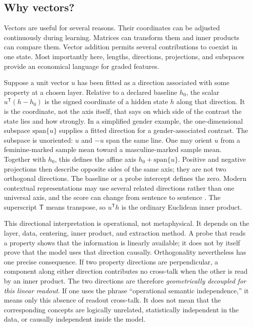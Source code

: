 \documentclass[
  aps,
  reprint,
  superscriptaddress,
  floatfix,
  nofootinbib,
  longbibliography
]{revtex4-2}
\newcommand{\T}{^{\mathsf T}}
\begin{document}
\subsection{Why vectors?}

Vectors are useful for several reasons.  Their coordinates can be adjusted
continuously during learning.  Matrices can transform them and inner products
can compare them.  Vector addition permits several contributions to coexist
in one state.  Most importantly here, lengths, directions, projections, and
subspaces provide an economical language for graded features.

Suppose a unit vector $u$ has been fitted as a direction associated with some
property at a chosen layer.  Relative to a declared baseline $h_0$, the scalar
$u\T(h-h_0)$ is the signed coordinate of a hidden state $h$ along that
direction.  It is the coordinate, not the axis itself, that says on which side
of the contrast the state lies and how strongly.  In a simplified gender
example, the one-dimensional subspace $\mathrm{span}\{u\}$ supplies a fitted
direction for a gender-associated contrast.  The subspace is unoriented:
$u$ and $-u$ span the same line.  One may orient $u$ from a feminine-marked
sample mean toward a masculine-marked sample mean.  Together with $h_0$, this
defines the affine axis $h_0+\mathrm{span}\{u\}$.  Positive and negative projections then
describe opposite sides of the same axis; they are not two orthogonal
directions.  The baseline or a probe intercept defines the zero.  Modern
contextual representations may use several related directions rather than one
universal axis, and the score can change from sentence to sentence
\cite{bolukbasi2016gender,zhao2019contextualgender}.  The superscript
$\mathsf T$ means transpose, so $u\T h$ is the ordinary Euclidean inner
product.

This directional interpretation is operational, not metaphysical.  It depends
on the layer, data, centering, inner product, and extraction method.  A probe
that reads a property shows that the information is linearly available; it
does not by itself prove that the model uses that direction causally.
Orthogonality nevertheless has one precise consequence.  If two property
directions are perpendicular, a component along either direction contributes
no cross-talk when the other is read by an inner product.  The two directions
are therefore \emph{geometrically decoupled for this linear readout}.  If one
uses the phrase ``operational semantic independence,'' it means only this
absence of readout cross-talk.  It does not mean that the corresponding concepts are
logically unrelated, statistically independent in the data, or causally
independent inside the model.
\end{document}

